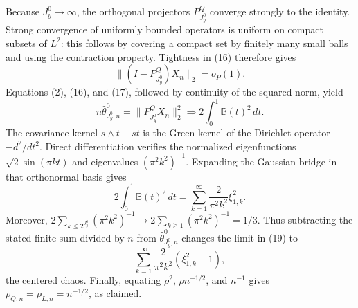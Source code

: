 Because \(J_y^0\to\infty\), the orthogonal projectors
\(P^Q_{J_y^0}\) converge strongly to the identity.  Strong convergence of uniformly bounded operators is uniform on compact subsets of \(L^2\): this follows by covering a compact set by finitely many small balls and using the contraction property.  Tightness in (16) therefore gives
\[
\|(I-P^Q_{J_y^0})X_n\|_2=o_P(1).                           \tag{17}
\]
Equations (2), (16), and (17), followed by continuity of the squared norm, yield
\[
n\widehat\theta^0_{J_y^0,n}
=\|P^Q_{J_y^0}X_n\|_2^2
\Rightarrow2\int_0^1\mathbb B(t)^2\,dt.                   \tag{18}
\]
The covariance kernel \(s\wedge t-st\) is the Green kernel of the Dirichlet operator \(-d^2/dt^2\).  Direct differentiation verifies the normalized eigenfunctions
\(\sqrt2\sin(\pi kt)\) and eigenvalues \((\pi^2k^2)^{-1}\).  Expanding the Gaussian bridge in that orthonormal basis gives
\[
2\int_0^1\mathbb B(t)^2\,dt
=\sum_{k=1}^{\infty}\frac{2}{\pi^2k^2}\xi_{1,k}^2.        \tag{19}
\]
Moreover,
\(2\sum_{k\le2^{J_y^0}}(\pi^2k^2)^{-1}\to
2\sum_{k\ge1}(\pi^2k^2)^{-1}=1/3\).  Thus subtracting the stated finite sum divided by \(n\) from \(\widehat\theta^0_{J_y^0,n}\) changes the limit in (19) to
\[
\sum_{k=1}^{\infty}\frac{2}{\pi^2k^2}(\xi_{1,k}^2-1),
\]
the centered chaos.  Finally, equating \(\rho^2\), \(\rho n^{-1/2}\), and \(n^{-1}\) gives
\(\rho_{Q,n}=\rho_{L,n}=n^{-1/2}\), as claimed.